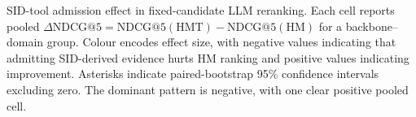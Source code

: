 \caption{SID-tool admission effect in fixed-candidate LLM reranking. Each cell reports pooled $\Delta\mathrm{NDCG}@5 = \mathrm{NDCG}@5(\mathrm{HMT})-\mathrm{NDCG}@5(\mathrm{HM})$ for a backbone--domain group. Colour encodes effect size, with negative values indicating that admitting SID-derived evidence hurts HM ranking and positive values indicating improvement. Asterisks indicate paired-bootstrap 95\% confidence intervals excluding zero. The dominant pattern is negative, with one clear positive pooled cell.}
\label{fig:admission-delta}
